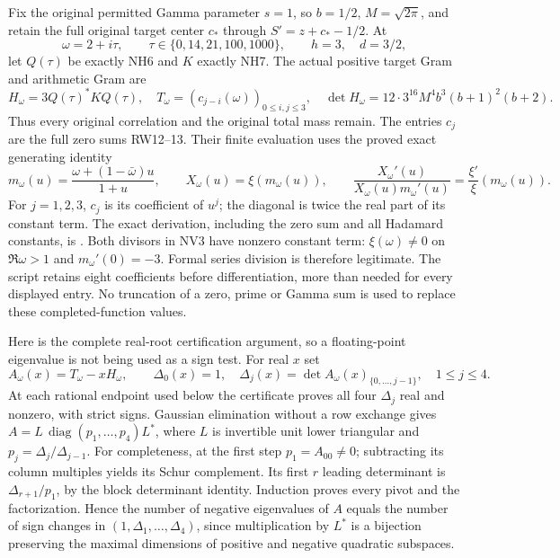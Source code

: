 \documentclass[11pt]{article}
\newcommand{\diag}{\operatorname{diag}}
\begin{document}
Fix the original permitted Gamma parameter $s=1$, so
$b=1/2$, $M=\sqrt{2\pi}$, and retain the full original target
center $c_*$ through $S'=z+c_*-1/2$. At
\[
 \omega=2+i\tau,\qquad \tau\in\{0,14,21,100,1000\},\qquad
 h=3,\quad d=3/2,
 \tag{NV1}
\]
let $Q(\tau)$ be exactly NH6 and $K$ exactly NH7. The actual
positive target Gram and arithmetic Gram are
\[
 H_\omega=3Q(\tau)^*KQ(\tau),\quad
 T_\omega=(c_{j-i}(\omega))_{0\le i,j\le3},\quad
 \det H_\omega=12\cdot3^{16}M^4b^3(b+1)^2(b+2).
 \tag{NV2}
\]
Thus every original correlation and the original total mass remain.
The entries $c_j$ are the full zero sums RW12--13. Their
finite evaluation uses the proved exact generating identity
\[
 m_\omega(u)=\frac{\omega+(1-\bar\omega)u}{1+u},\qquad
 X_\omega(u)=\xi(m_\omega(u)),\qquad
 \frac{X_\omega'(u)}{X_\omega(u)m_\omega'(u)}
 =\frac{\xi'}{\xi}(m_\omega(u)).
 \tag{NV3}
\]
For $j=1,2,3$, $c_j$ is its coefficient of $u^j$; the
diagonal is twice the real part of its constant term.
The exact derivation, including the zero sum and all
Hadamard constants, is \cite[MP6--15]{MovableWeil}.
Both divisors in NV3 have nonzero constant term:
$\xi(\omega)\ne0$ on $\Re\omega>1$ and
$m_\omega'(0)=-3$. Formal series division is therefore
legitimate. The script retains eight coefficients before
differentiation, more than needed for every displayed entry.
No truncation of a zero, prime or Gamma sum is used to
replace these completed-function values.

Here is the complete real-root certification argument,
so a floating-point eigenvalue is not being used as a sign
test. For real $x$ set
\[
 A_\omega(x)=T_\omega-xH_\omega,\qquad
 \Delta_0(x)=1,\quad
 \Delta_j(x)=\det A_\omega(x)_{\{0,\ldots,j-1\}},
 \quad1\le j\le4.
 \tag{NV4}
\]
At each rational endpoint used below the certificate proves
all four $\Delta_j$ real and nonzero, with strict signs.
Gaussian elimination without a row exchange gives
$A=L\,\diag(p_1,\ldots,p_4)L^*$, where $L$ is invertible
unit lower triangular and $p_j=\Delta_j/\Delta_{j-1}$.
For completeness, at the first step $p_1=A_{00}\ne0$;
subtracting its column multiples yields its Schur complement.
Its first $r$ leading determinant is
$\Delta_{r+1}/p_1$, by the block determinant identity.
Induction proves every pivot and the factorization.
Hence the number of negative eigenvalues of $A$ equals
the number of sign changes in
$(1,\Delta_1,\ldots,\Delta_4)$, since multiplication by
$L^*$ is a bijection preserving the maximal dimensions
of positive and negative quadratic subspaces.
\end{document}
